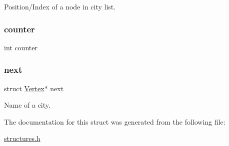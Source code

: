 Position/\+Index of a node in city list. 

\mbox{\label{struct_vertex_a617a47c70795bcff659815ad0efd2266}} 
\subsubsection{\texorpdfstring{counter}{counter}}
{\footnotesize\ttfamily int counter}

\mbox{\label{struct_vertex_ad959a48c566626429c5091adfbd48bac}} 
\subsubsection{\texorpdfstring{next}{next}}
{\footnotesize\ttfamily struct \mbox{\hyperlink{struct_vertex}{Vertex}}$\ast$ next}



Name of a city. 



The documentation for this struct was generated from the following file\+:\begin{DoxyCompactItemize}
\item 
\mbox{\hyperlink{structures_8h}{structures.\+h}}\end{DoxyCompactItemize}
